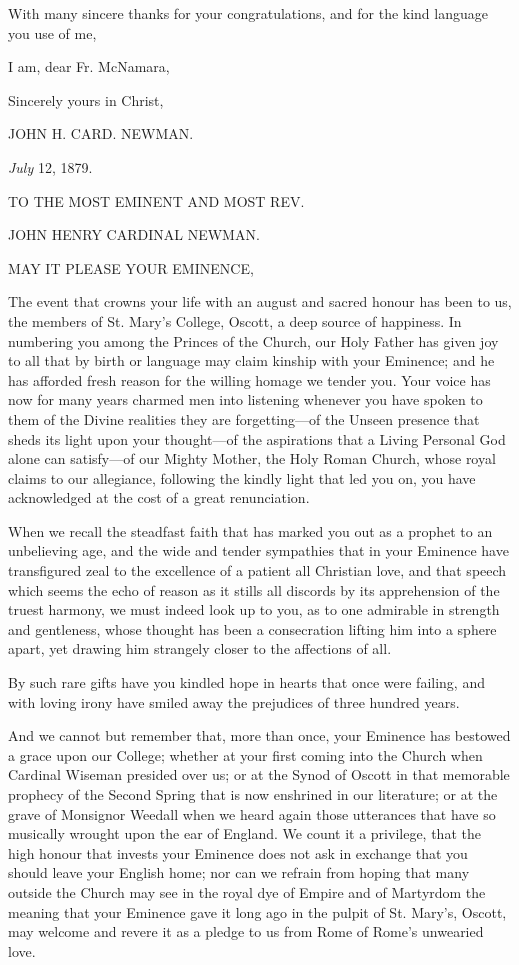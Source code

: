 With many sincere thanks for your congratulations, and for the kind
language you use of me,

I am, dear Fr. McNamara,

Sincerely yours in Christ,

JOHN H. CARD. NEWMAN.


\emph{July} 12, 1879.

TO THE MOST
EMINENT AND MOST
REV.

JOHN HENRY CARDINAL
NEWMAN.

MAY IT PLEASE
YOUR EMINENCE,

The event that crowns your life with an august and sacred honour has
been to us, the members of St. Mary's College, Oscott, a deep source
of happiness. In numbering you among the Princes of the Church, our
Holy Father has given joy to all that by birth or language may claim
kinship with your Eminence; and he has afforded fresh reason for the
willing homage we tender you. Your voice has now for many years
charmed men into listening whenever you have spoken to them of the
Divine realities they are forgetting—of the Unseen presence that
sheds its light upon your thought—of the aspirations that a Living
Personal God alone can satisfy—of our Mighty Mother, the Holy Roman
Church, whose royal claims to our allegiance, following the
kindly light that led you on, you have acknowledged at the cost of a
great renunciation.

When we recall the steadfast faith that has marked you out as a
prophet to an unbelieving age, and the wide and tender sympathies that
in your Eminence have transfigured zeal to the excellence of a patient
all Christian love, and that speech which seems the echo of reason as
it stills all discords by its apprehension of the truest harmony, we
must indeed look up to you, as to one admirable in strength and
gentleness, whose thought has been a consecration lifting him into a
sphere apart, yet drawing him strangely closer to the affections of
all.

By such rare gifts have you kindled hope in hearts that once were
failing, and with loving irony have smiled away the prejudices of
three hundred years.

And we cannot but remember that, more than once, your Eminence has
bestowed a grace upon our College; whether at your first coming into
the Church when Cardinal Wiseman presided over us; or at the Synod of
Oscott in that memorable prophecy of the Second Spring that is now
enshrined in our literature; or at the grave of Monsignor Weedall when
we heard again those utterances that have so musically wrought upon
the ear of England. We count it a privilege, that the high honour that
invests your Eminence does not ask in exchange that you should
leave your English home; nor can we refrain from hoping that many
outside the Church may see in the royal dye of Empire and of Martyrdom
the meaning that your Eminence gave it long ago in the pulpit of St.
Mary's, Oscott, may welcome and revere it as a pledge to us from Rome
of Rome's unwearied love.

